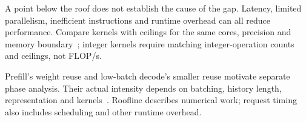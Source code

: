 A point below the roof does not establish the cause of the gap.
Latency, limited parallelism, inefficient instructions and runtime overhead
can all reduce performance.  Compare kernels with ceilings for the same
cores, precision and memory boundary~\cite{nerscroofline2026}; integer
kernels require matching integer-operation counts and ceilings, not FLOP/s.

Prefill's weight reuse and low-batch decode's smaller reuse motivate
separate phase analysis.  Their actual intensity depends on batching,
history length, representation and kernels~\cite{na2024llmcpu}.
Roofline describes numerical work; request timing also includes scheduling
and other runtime overhead.
\FloatBarrier
